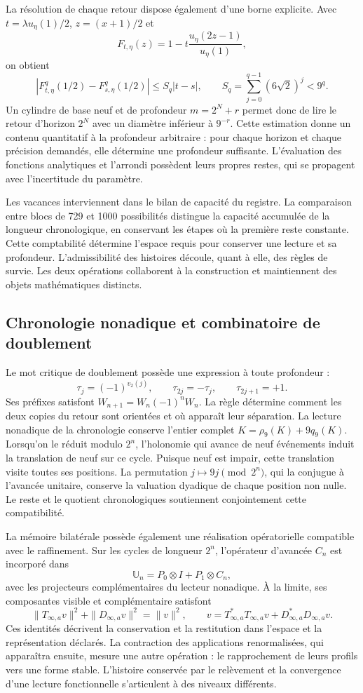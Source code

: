 La résolution de chaque retour dispose également d’une borne explicite. Avec
\(t=\lambda u_\eta(1)/2\), \(z=(x+1)/2\) et
\[
F_{t,\eta}(z)=1-t\frac{u_\eta(2z-1)}{u_\eta(1)},
\]
on obtient
\[
\left|F_{t,\eta}^{q}(1/2)-F_{s,\eta}^{q}(1/2)\right|
\le S_q|t-s|,\qquad S_q=\sum_{j=0}^{q-1}(6\sqrt2)^j<9^q.
\]
Un cylindre de base neuf et de profondeur \(m=2^N+r\) permet donc de lire
le retour d’horizon \(2^N\) avec un diamètre inférieur à \(9^{-r}\). Cette
estimation donne un contenu quantitatif à la profondeur arbitraire : pour chaque
horizon et chaque précision demandés, elle détermine une profondeur suffisante.
L’évaluation des fonctions analytiques et l’arrondi possèdent leurs propres
restes, qui se propagent avec l’incertitude du paramètre.

Les vacances interviennent dans le bilan de capacité du registre. La
comparaison entre blocs de 729 et 1000 possibilités distingue la capacité
accumulée de la longueur chronologique, en conservant les étapes où la première
reste constante. Cette comptabilité détermine l’espace requis pour
conserver une lecture et sa profondeur. L’admissibilité des histoires
découle, quant à elle, des règles de survie. Les deux opérations
collaborent à la construction et maintiennent des objets mathématiques distincts.

\subsection{Chronologie nonadique et combinatoire de doublement}

Le mot critique de doublement possède une expression à toute profondeur :
\[
\tau_j=(-1)^{v_2(j)},\qquad
\tau_{2j}=-\tau_j,\qquad \tau_{2j+1}=+1.
\]
Ses préfixes satisfont \(W_{n+1}=W_n(-1)^nW_n\). La règle détermine comment
les deux copies du retour sont orientées et où apparaît leur séparation. La
lecture nonadique de la chronologie conserve l’entier complet
\(K=\rho_9(K)+9q_9(K)\). Lorsqu’on le réduit modulo \(2^n\), l’holonomie qui
avance de neuf événements induit la translation de neuf sur ce cycle. Puisque
neuf est impair, cette translation visite toutes ses positions. La
permutation \(j\mapsto9j\pmod{2^n}\), qui la conjugue à l’avancée unitaire,
conserve la valuation dyadique de chaque position non nulle. Le reste et le quotient
chronologiques soutiennent conjointement cette compatibilité.

La mémoire bilatérale possède également une réalisation opératorielle compatible
avec le raffinement. Sur les cycles de longueur \(2^n\), l’opérateur
d’avancée \(C_n\) est incorporé dans
\[
\mathbb U_n=P_0\otimes I+P_1\otimes C_n,
\]
avec les projecteurs complémentaires du lecteur nonadique. À la limite, ses
composantes visible et complémentaire satisfont
\[
\|T_{\infty,a}v\|^2+\|D_{\infty,a}v\|^2=\|v\|^2,
\qquad
v=T_{\infty,a}^*T_{\infty,a}v+D_{\infty,a}^*D_{\infty,a}v.
\]
Ces identités décrivent la conservation et la restitution dans l’espace
et la représentation déclarés. La contraction des applications renormalisées,
qui apparaîtra ensuite, mesure une autre opération : le rapprochement de leurs profils
vers une forme stable. L’histoire conservée par le relèvement et la
convergence d’une lecture fonctionnelle s’articulent à des niveaux différents.

